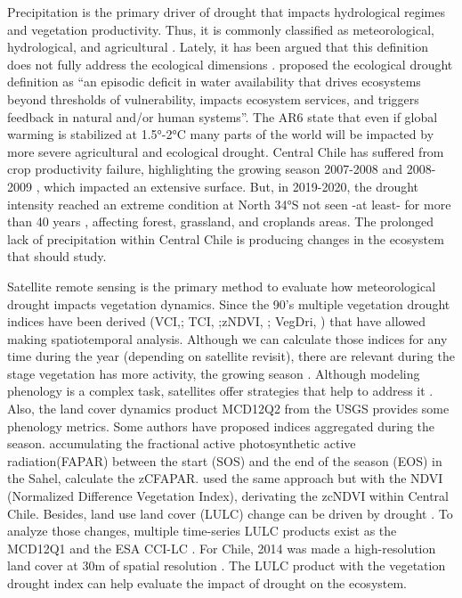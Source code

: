 \documentclass[preprint,
3p]{elsarticle} %
\begin{document}
Precipitation is the primary driver of drought that impacts hydrological
regimes and vegetation productivity. Thus, it is commonly classified as
meteorological, hydrological, and agricultural \citep{Wilhite1985}.
Lately, it has been argued that this definition does not fully address
the ecological dimensions \citep{Crausbay2017}. \citet{Crausbay2017}
proposed the ecological drought definition as ``an episodic deficit in
water availability that drives ecosystems beyond thresholds of
vulnerability, impacts ecosystem services, and triggers feedback in
natural and/or human systems''. The AR6 \citep{IPCC2021} state that even
if global warming is stabilized at 1.5°-2°C many parts of the world will
be impacted by more severe agricultural and ecological drought. Central
Chile has suffered from crop productivity failure, highlighting the
growing season 2007-2008 and 2008-2009
\citep{Zambrano2016, Zambrano2018}, which impacted an extensive surface.
But, in 2019-2020, the drought intensity reached an extreme condition at
North 34°S not seen -at least- for more than 40 years
\citep{Zambrano2020}, affecting forest, grassland, and croplands areas.
The prolonged lack of precipitation within Central Chile is producing
changes in the ecosystem that should study.

Satellite remote sensing \citep{West2019, AghaKouchak2015} is the
primary method to evaluate how meteorological drought impacts vegetation
dynamics. Since the 90's multiple vegetation drought indices have been
derived (VCI,\citep{Kogan1990}; TCI, \citep{Kogan1995};zNDVI,
\citep{Peters2002}; VegDri, \citep{Brown2008}) that have allowed making
spatiotemporal analysis. Although we can calculate those indices for any
time during the year (depending on satellite revisit), there are
relevant during the stage vegetation has more activity, the growing
season \citep{Mishra2015}. Although modeling phenology is a complex
task, satellites offer strategies that help to address it
\citep{Younes2021, Vrieling2018, Cai2017}. Also, the land cover dynamics
product MCD12Q2 from the USGS \citep{Friedl2019} provides some phenology
metrics. Some authors have proposed indices aggregated during the
season. \citet{Meroni2017} accumulating the fractional active
photosynthetic active radiation(FAPAR) between the start (SOS) and the
end of the season (EOS) in the Sahel, calculate the zCFAPAR.
\citet{Zambrano2018} used the same approach but with the NDVI
(Normalized Difference Vegetation Index), derivating the zcNDVI within
Central Chile. Besides, land use land cover (LULC) change can be driven
by drought \citep{Tran2019, Akinyemi2021}. To analyze those changes,
multiple time-series LULC products exist as the MCD12Q1
\citep{Friedl2019} and the ESA CCI-LC \citep{ESA2017}. For Chile, 2014
was made a high-resolution land cover at 30m of spatial resolution
\citep{Zhao2016}. The LULC product with the vegetation drought index can
help evaluate the impact of drought on the ecosystem.
\end{document}
